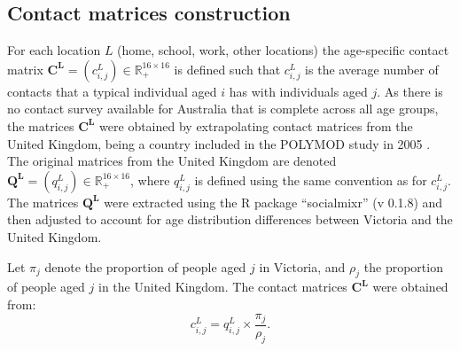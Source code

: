 \subsection{Contact matrices construction}
\label{matrix_construction}
For each location $L$ (home, school, work, other locations) the age-specific contact matrix $\mathbf{C^L} = (c_{i,j}^L) \in \mathbb{R}_{+}^{16 \times 16}$ is defined such that $c_{i,j}^L$ is the average number of contacts that a typical individual aged $i$ has with individuals aged $j$. As there is no contact survey available for Australia that is complete across all age groups, the matrices $\mathbf{C^L}$ were obtained by extrapolating contact matrices from the United Kingdom, being a country included in the POLYMOD study in 2005 \cite{RN141}. The original matrices from the United Kingdom are denoted $\mathbf{Q^L} = (q_{i,j}^L) \in \mathbb{R}_{+}^{16 \times 16}$, where $q_{i,j}^L$ is defined using the same convention as for $c_{i,j}^L$. The matrices $\mathbf{Q^L}$ were extracted using the R package ``socialmixr'' (v 0.1.8) and then adjusted to account for age distribution differences between Victoria and the United Kingdom.

Let $\pi_j$ denote the proportion of people aged $j$ in Victoria, and $\rho_j$ the proportion of people aged $j$ in the United Kingdom. The contact matrices $\mathbf{C^L}$ were obtained from:
$$
c_{i,j}^L = q_{i,j}^L \times \frac{\pi_j}{\rho_j} . 
$$